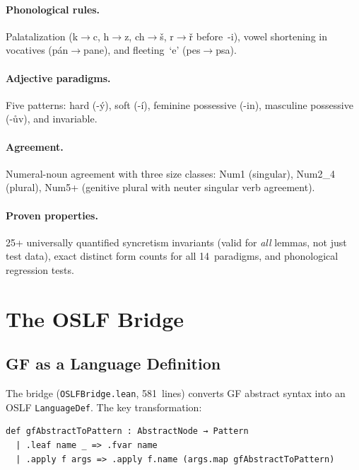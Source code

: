 \documentclass[11pt]{article}
\newcommand{\code}[1]{\texttt{#1}}
\newcommand{\OSLF}{\textup{OSLF}}
\newcommand{\GF}{\textup{GF}}
\begin{document}
\paragraph{Phonological rules.}  Palatalization (k$\to$c, h$\to$z,
ch$\to$\v{s}, r$\to$\v{r} before~-i), vowel shortening in vocatives
(p\'{a}n$\to$pane), and fleeting~`e' (pes$\to$psa).

\paragraph{Adjective paradigms.}  Five patterns: hard (-\'{y}), soft (-\'{i}),
feminine possessive (-in), masculine possessive (-\r{u}v), and invariable.

\paragraph{Agreement.}  Numeral-noun agreement with three size classes:
Num1 (singular), Num2\_4 (plural), Num5+ (genitive plural with neuter
singular verb agreement).

\paragraph{Proven properties.}  25+ universally quantified syncretism
invariants (valid for \emph{all} lemmas, not just test data), exact distinct
form counts for all 14~paradigms, and phonological regression tests.

\section{The OSLF Bridge}
\label{sec:bridge}

\subsection{GF as a Language Definition}

The bridge (\code{OSLFBridge.lean}, 581~lines) converts \GF{} abstract syntax
into an \OSLF{} \code{LanguageDef}.  The key transformation:

\begin{lstlisting}[language=ml,caption={Abstract tree to pattern conversion}]
def gfAbstractToPattern : AbstractNode → Pattern
  | .leaf name _ => .fvar name
  | .apply f args => .apply f.name (args.map gfAbstractToPattern)
\end{lstlisting}
\end{document}

